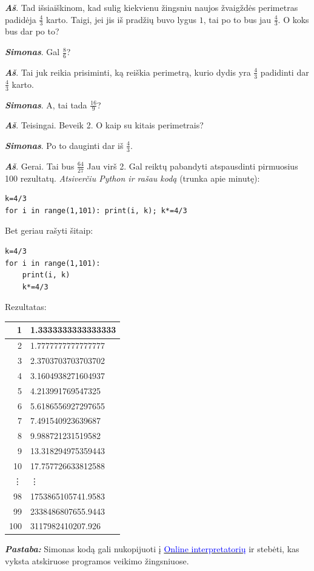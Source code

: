 \documentclass[a4paper]{article}
\newcommand{\say}[1]{\textbf{\textit{#1}}}
\begin{document}
\say{Aš}. Tad išsiaiškinom, kad sulig kiekvienu žingsniu naujos žvaigždės perimetras padidėja $\frac{4}{3}$ karto. Taigi, jei jis iš pradžių buvo lygus $1$, tai po to bus jau $\frac{4}{3}$. O koks bus dar po to?

\say{Simonas}. Gal $\frac{8}{6}$?

\say{Aš}. Tai juk reikia prisiminti, ką reiškia perimetrą, kurio dydis yra $\frac{4}{3}$ padidinti dar $\frac{4}{3}$ karto. 

\say{Simonas}. A, tai tada $\frac{16}{9}$?

\say{Aš}. Teisingai. Beveik 2. O kaip su kitais perimetrais? 

\say{Simonas}. Po to dauginti dar iš $\frac{4}{3}$. 

\say{Aš}. Gerai. Tai bus $\frac{64}{27}$ Jau virš 2. Gal reiktų pabandyti atspausdinti pirmuosius 100 rezultatų. \textit{Atsiverčiu Python ir rašau kodą} (trunka apie minutę):
\begin{verbatim}
k=4/3
for i in range(1,101): print(i, k); k*=4/3
\end{verbatim}
Bet geriau rašyti šitaip:
\begin{verbatim}
k=4/3
for i in range(1,101): 
    print(i, k)
    k*=4/3
\end{verbatim}
Rezultatas:

\begin{tabular}{|r|l|}
\hline
1 & 1.3333333333333333\\ \hline
2 & 1.7777777777777777\\ \hline
3 & 2.3703703703703702\\ \hline
4 & 3.1604938271604937\\ \hline
5 & 4.213991769547325\\ \hline
6 & 5.6186556927297655\\ \hline
7 & 7.491540923639687\\ \hline
8 & 9.988721231519582\\ \hline
9 & 13.318294975359443\\ \hline
10 & 17.757726633812588\\
\vdots & \vdots \\
98 & 1753865105741.9583\\ \hline
99 & 2338486807655.9443\\ \hline
100 & 3117982410207.926\\ \hline
\end{tabular}

\say{Pastaba:} Simonas kodą gali nukopijuoti į \href{http://pythontutor.com/visualize.html\#mode=edit}{\textcolor{blue}{Online interpretatorių}} ir stebėti, kas vyksta atskiruose programos veikimo žingsniuose.
\end{document}
